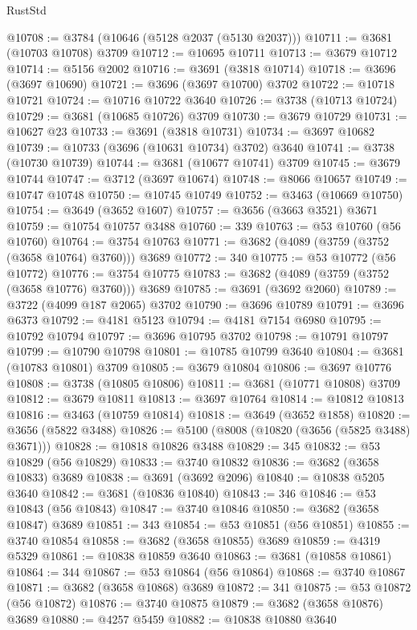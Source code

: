 \begin{lexlean}{RustStd}
\begin{coremodule}
@10708 := @3784 (@10646 (@5128 @2037 (@5130 @2037)))
@10711 := @3681 (@10703 @10708) @3709
@10712 := @10695 @10711
@10713 := @3679 @10712
@10714 := @5156 @2002
@10716 := @3691 (@3818 @10714)
@10718 := @3696 (@3697 @10690)
@10721 := @3696 (@3697 @10700) @3702
@10722 := @10718 @10721
@10724 := @10716 @10722 @3640
@10726 := @3738 (@10713 @10724)
@10729 := @3681 (@10685 @10726) @3709
@10730 := @3679 @10729
@10731 := @10627 @23
@10733 := @3691 (@3818 @10731)
@10734 := @3697 @10682
@10739 := @10733 (@3696 (@10631 @10734) @3702) @3640
@10741 := @3738 (@10730 @10739)
@10744 := @3681 (@10677 @10741) @3709
@10745 := @3679 @10744
@10747 := @3712 (@3697 @10674)
@10748 := @8066 @10657
@10749 := @10747 @10748
@10750 := @10745 @10749
@10752 := @3463 (@10669 @10750)
@10754 := @3649 (@3652 @1607)
@10757 := @3656 (@3663 @3521) @3671
@10759 := @10754 @10757 @3488
@10760 := 339
@10763 := @53 @10760 (@56 @10760)
@10764 := @3754 @10763
@10771 := @3682 (@4089 (@3759 (@3752 (@3658 @10764) @3760))) @3689
@10772 := 340
@10775 := @53 @10772 (@56 @10772)
@10776 := @3754 @10775
@10783 := @3682 (@4089 (@3759 (@3752 (@3658 @10776) @3760))) @3689
@10785 := @3691 (@3692 @2060)
@10789 := @3722 (@4099 @187 @2065) @3702
@10790 := @3696 @10789
@10791 := @3696 @6373
@10792 := @4181 @5123
@10794 := @4181 @7154 @6980
@10795 := @10792 @10794
@10797 := @3696 @10795 @3702
@10798 := @10791 @10797
@10799 := @10790 @10798
@10801 := @10785 @10799 @3640
@10804 := @3681 (@10783 @10801) @3709
@10805 := @3679 @10804
@10806 := @3697 @10776
@10808 := @3738 (@10805 @10806)
@10811 := @3681 (@10771 @10808) @3709
@10812 := @3679 @10811
@10813 := @3697 @10764
@10814 := @10812 @10813
@10816 := @3463 (@10759 @10814)
@10818 := @3649 (@3652 @1858)
@10820 := @3656 (@5822 @3488)
@10826 := @5100 (@8008 (@10820 (@3656 (@5825 @3488) @3671)))
@10828 := @10818 @10826 @3488
@10829 := 345
@10832 := @53 @10829 (@56 @10829)
@10833 := @3740 @10832
@10836 := @3682 (@3658 @10833) @3689
@10838 := @3691 (@3692 @2096)
@10840 := @10838 @5205 @3640
@10842 := @3681 (@10836 @10840)
@10843 := 346
@10846 := @53 @10843 (@56 @10843)
@10847 := @3740 @10846
@10850 := @3682 (@3658 @10847) @3689
@10851 := 343
@10854 := @53 @10851 (@56 @10851)
@10855 := @3740 @10854
@10858 := @3682 (@3658 @10855) @3689
@10859 := @4319 @5329
@10861 := @10838 @10859 @3640
@10863 := @3681 (@10858 @10861)
@10864 := 344
@10867 := @53 @10864 (@56 @10864)
@10868 := @3740 @10867
@10871 := @3682 (@3658 @10868) @3689
@10872 := 341
@10875 := @53 @10872 (@56 @10872)
@10876 := @3740 @10875
@10879 := @3682 (@3658 @10876) @3689
@10880 := @4257 @5459
@10882 := @10838 @10880 @3640

\end{coremodule}
\end{lexlean}
